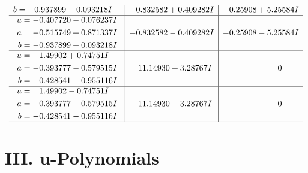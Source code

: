 \documentclass[1p]{elsarticle_modified}
\theoremstyle{definition}
\begin{document}
$$\begin{array}{c|c|c}
\begin{aligned}
b &= -0.937899 - 0.093218 I\end{aligned}
 & -0.832582 + 0.409282 I & -0.25908 + 5.25584 I \\ \hline\begin{aligned}
u &= -0.407720 - 0.076237 I \\
a &= -0.515749 + 0.871337 I \\
b &= -0.937899 + 0.093218 I\end{aligned}
 & -0.832582 - 0.409282 I & -0.25908 - 5.25584 I \\ \hline\begin{aligned}
u &= \phantom{-}1.49902 + 0.74751 I \\
a &= -0.393777 - 0.579515 I \\
b &= -0.428541 + 0.955116 I\end{aligned}
 & \phantom{-}11.14930 + 3.28767 I & \phantom{-0.000000 } 0 \\ \hline\begin{aligned}
u &= \phantom{-}1.49902 - 0.74751 I \\
a &= -0.393777 + 0.579515 I \\
b &= -0.428541 - 0.955116 I\end{aligned}
 & \phantom{-}11.14930 - 3.28767 I & \phantom{-0.000000 } 0\\
 \hline 
 \end{array}$$\newpage
\newpage\renewcommand{\arraystretch}{1}
\centering \section*{ III. u-Polynomials}
\end{document}
